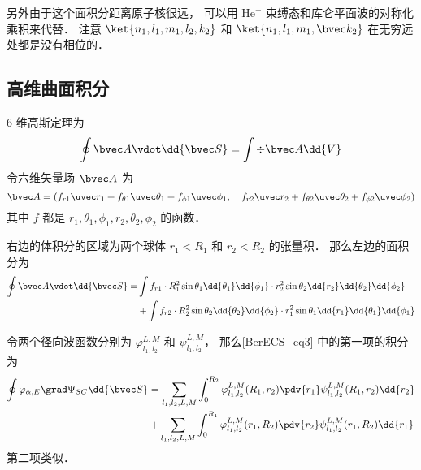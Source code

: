 另外由于这个面积分距离原子核很远， 可以用 $\mathrm{He}^+$ 束缚态和库仑平面波的对称化乘积来代替． 注意 $\ket{n_1,l_1,m_1,l_2,k_2}$ 和 $\ket{n_1,l_1,m_1,\bvec k_2}$ 在无穷远处都是没有相位的．

\subsection{高维曲面积分}
6 维高斯定理为
\begin{equation}
\oint \bvec A\vdot \dd{\bvec S} = \int \div \bvec A \dd{V}
\end{equation}
令六维矢量场 $\bvec A$ 为
\begin{equation}
\bvec A = (f_{r1} \uvec r_1 + f_{\theta1}\uvec \theta_1 + f_{\phi1}\uvec \phi_1, \quad f_{r2} \uvec r_2 + f_{\theta2}\uvec \theta_2 + f_{\phi2}\uvec \phi_2)
\end{equation}
其中 $f$ 都是 $r_1,\theta_1,\phi_1,r_2,\theta_2,\phi_2$ 的函数．

右边的体积分的区域为两个球体 $r_1<R_1$ 和 $r_2<R_2$ 的张量积． 那么左边的面积分为
\begin{equation}
\begin{aligned}
\oint \bvec A\vdot \dd{\bvec S} =&\int f_{r1}\cdot  R_1^2\sin\theta_1\dd{\theta_1}\dd{\phi_1}\cdot r_2^2\sin\theta_2 \dd{r_2}\dd{\theta_2}\dd{\phi_2}\\
&+\int f_{r2}\cdot  R_2^2\sin\theta_2\dd{\theta_2}\dd{\phi_2}\cdot r_1^2\sin\theta_1 \dd{r_1}\dd{\theta_1}\dd{\phi_1}
\end{aligned}
\end{equation}

令两个径向波函数分别为 $\varphi_{l_1,l_2}^{L,M}$ 和 $\psi_{l_1,l_2}^{L,M}$， 那么\autoref{BerECS_eq3} 中的第一项的积分为
\begin{equation}
\begin{aligned}
\oint \varphi_{\alpha,E} \grad \Psi_{SC} \dd{\bvec S} &= \sum_{l_1,l_2,L,M}\int_0^{R_2} \varphi_{l_1,l_2}^{L,M}(R_1,r_2) \pdv{r_1} \psi_{l_1,l_2}^{L,M}(R_1,r_2)\dd{r_2}\\
&+\sum_{l_1,l_2,L,M}\int_0^{R_1} \varphi_{l_1,l_2}^{L,M}(r_1,R_2) \pdv{r_2} \psi_{l_1,l_2}^{L,M}(r_1,R_2)\dd{r_1}
\end{aligned}
\end{equation}
第二项类似．
